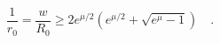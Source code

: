 \begin{equation}
\frac{1}{r_0} = \frac{w}{R_0} \geq 2
e^{\mu/2}\left(e^{\mu/2}+\sqrt{e^{\mu}-1}\right)\quad.
\end{equation}

